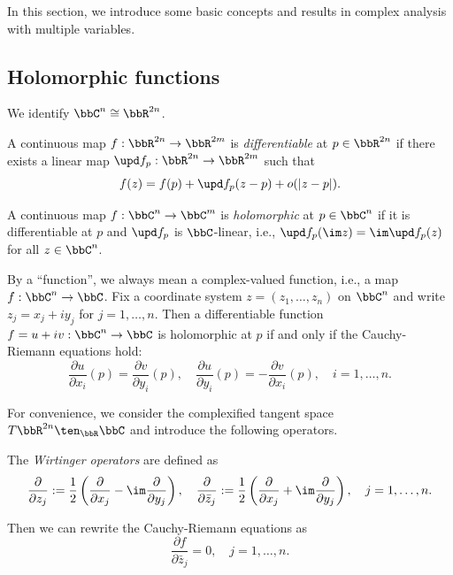 

In this section, we introduce some basic concepts and results in complex analysis with multiple variables.



\subsection{Holomorphic functions}

We identify \(\bbC^n \cong \bbR^{2n}\).

\begin{definition}\label{def:differentiable_and_holomorphic_map}
	A continuous map \(f: \bbR^{2n} \to \bbR^{2m}\) is \emph{differentiable} at \(p \in \bbR^{2n}\) if there exists a linear map \(\upd f_p: \bbR^{2n} \to \bbR^{2m}\) such that
	\[ f(z) = f(p) + \upd f_p(z - p) + o(|z - p|). \]

	A continuous map \(f: \bbC^n \to \bbC^m\) is \emph{holomorphic} at \(p \in \bbC^n\) if it is differentiable at \(p\) and \(\upd f_p\) is \(\bbC\)-linear, i.e., \(\upd f_p(\im z) = \im \upd f_p(z)\) for all \(z \in \bbC^n\).
\end{definition}

By a ``function'', we always mean a complex-valued function, i.e., a map \(f: \bbC^n \to \bbC\).
Fix a coordinate system \(z = (z_1, \ldots, z_n)\) on \(\bbC^n\) and write \(z_j = x_j + iy_j\) for \(j = 1, \ldots, n\).
Then a differentiable function \(f = u+iv: \bbC^n \to \bbC\) is holomorphic at \(p\) if and only if the Cauchy-Riemann equations hold:
\[ \frac{\partial u}{\partial x_i}(p) = \frac{\partial v}{\partial y_i}(p), \quad \frac{\partial u}{\partial y_i}(p) = -\frac{\partial v}{\partial x_i}(p), \quad i = 1, \ldots, n. \]

For convenience, we consider the complexified tangent space \(T\bbR^{2n} \ten_\bbR \bbC\) and introduce the following operators.

\begin{definition}\label{def:Wirtinger_operators}
	The \emph{Wirtinger operators} are defined as
	\[ \frac{\partial}{\partial z_j} := \frac{1}{2} \left( \frac{\partial}{\partial x_j} - \im \frac{\partial}{\partial y_j} \right), \quad \frac{\partial}{\partial \bar{z}_j} := \frac{1}{2} \left( \frac{\partial}{\partial x_j} + \im \frac{\partial}{\partial y_j} \right), \quad j = 1, \ldots, n. \]
\end{definition}

Then we can rewrite the Cauchy-Riemann equations as
\[ \frac{\partial f}{\partial \bar{z}_j} = 0, \quad j = 1, \ldots, n. \]

